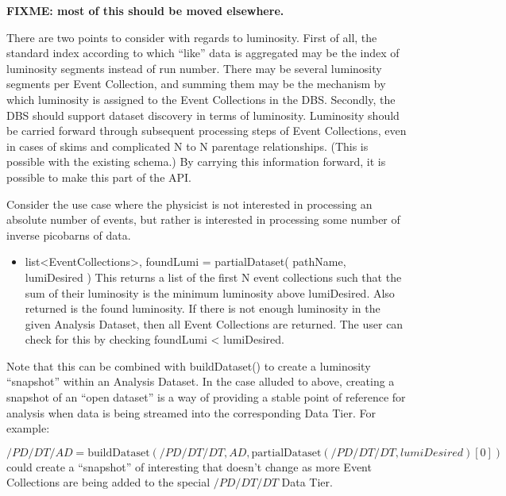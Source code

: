\documentclass{cmspaper}
\begin{document}
{{\bf FIXME: most of this should be moved elsewhere.}

  There are two points to consider with regards to luminosity.  First of
all, the standard index according to which ``like'' data is aggregated may
be the index of luminosity segments instead of run number.  There may be
several luminosity segments per Event Collection, and summing them may be
the mechanism by which luminosity is assigned to the Event Collections
in the DBS.   Secondly, the DBS should support dataset discovery in
terms of luminosity.  Luminosity should be carried forward through
subsequent processing steps of Event Collections, even in cases of
skims and complicated N to N parentage relationships.  (This is possible
with the existing schema.)  By carrying this information forward, it is
possible to make this part of the API.

  Consider the use case where the physicist is not interested in processing 
an absolute number of events, but rather is interested in processing some
number of inverse picobarns of data.

\begin{itemize}
\item  list<EventCollections>, foundLumi = partialDataset( pathName, lumiDesired )
       This returns a list of the first N event collections such that the sum 
       of their luminosity is the minimum luminosity above lumiDesired.  Also 
       returned is the found luminosity.  If there is not enough luminosity in 
       the given Analysis Dataset, then all Event Collections are returned.  
       The user can check for this by checking foundLumi < lumiDesired.

\end{itemize}

Note that this can be combined with buildDataset() to create a luminosity
``snapshot'' within an Analysis Dataset.  In the case alluded to above,
creating a snapshot of an ``open dataset'' is a way of providing a stable
point of reference for analysis when data is being streamed into the
corresponding Data Tier. For example:

\begin{equation}
   /PD/DT/AD = \mbox{buildDataset} ( /PD/DT/DT, AD, \mbox{partialDataset} ( /PD/DT/DT, lumiDesired )[0] )
\end{equation}
could create a ``snapshot'' of interesting that doesn't change as more Event 
Collections are being added to the special $/PD/DT/DT$ Data Tier.




}
\end{document}
